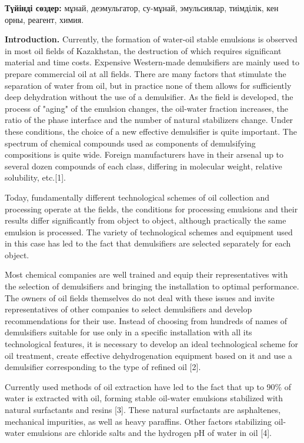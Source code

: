 {\bfseries Түйінді сөздер:} мұнай, деэмульгатор, су-мұнай, эмульсиялар,
тиімділік, кен орны, реагент, химия.

{\bfseries Introduction.} Currently, the formation of water-oil stable
emulsions is observed in most oil fields of Kazakhstan, the destruction
of which requires significant material and time costs. Expensive
Western-made demulsifiers are mainly used to prepare commercial oil at
all fields. There are many factors that stimulate the separation of
water from oil, but in practice none of them allows for sufficiently
deep dehydration without the use of a demulsifier. As the field is
developed, the process of "aging" of the emulsion changes, the oil-water
fraction increases, the ratio of the phase interface and the number of
natural stabilizers change. Under these conditions, the choice of a new
effective demulsifier is quite important. The spectrum of chemical
compounds used as components of demulsifying compositions is quite wide.
Foreign manufacturers have in their arsenal up to several dozen
compounds of each class, differing in molecular weight, relative
solubility, etc.{[}1{]}.

Today, fundamentally different technological schemes of oil collection
and processing operate at the fields, the conditions for processing
emulsions and their results differ significantly from object to object,
although practically the same emulsion is processed. The variety of
technological schemes and equipment used in this case has led to the
fact that demulsifiers are selected separately for each object.

Most chemical companies are well trained and equip their representatives
with the selection of demulsifiers and bringing the installation to
optimal performance. The owners of oil fields themselves do not deal
with these issues and invite representatives of other companies to
select demulsifiers and develop recommendations for their use. Instead
of choosing from hundreds of names of demulsifiers suitable for use only
in a specific installation with all its technological features, it is
necessary to develop an ideal technological scheme for oil treatment,
create effective dehydrogenation equipment based on it and use a
demulsifier corresponding to the type of refined oil {[}2{]}.

Currently used methods of oil extraction have led to the fact that up to
90\% of water is extracted with oil, forming stable oil-water emulsions
stabilized with natural surfactants and resins {[}3{]}. These natural
surfactants are asphaltenes, mechanical impurities, as well as heavy
paraffins. Other factors stabilizing oil-water emulsions are chloride
salts and the hydrogen pH of water in oil {[}4{]}.

